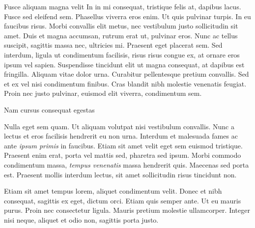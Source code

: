 \documentclass[final]{beamer}
\newlength{\colwidth}
\begin{document}
\begin{frame}[t]
\begin{columns}[t]
\begin{column}{\colwidth}
\begin{block}{Fusce aliquam magna velit}
    In in mi consequat, tristique felis at, dapibus lacus. Fusce sed eleifend
    sem. Phasellus viverra eros enim. Ut quis pulvinar turpis. In eu faucibus
    risus. Morbi convallis elit metus, nec vestibulum justo sollicitudin sit
    amet. Duis et magna accumsan, rutrum erat ut, pulvinar eros. Nunc ac tellus
    suscipit, sagittis massa nec, ultricies mi. Praesent eget placerat sem. Sed
    interdum, ligula ut condimentum facilisis, risus risus congue ex, at ornare
    eros ipsum vel sapien. Suspendisse tincidunt elit ut magna consequat, at
    dapibus est fringilla. Aliquam vitae dolor urna. Curabitur pellentesque
    pretium convallis. Sed et ex vel nisi condimentum finibus. Cras blandit
    nibh molestie venenatis feugiat. Proin nec justo pulvinar, euismod elit
    viverra, condimentum sem.

  \end{block}

  \begin{block}{Nam cursus consequat egestas}

    Nulla eget sem quam. Ut aliquam volutpat nisi vestibulum convallis. Nunc a
    lectus et eros facilisis hendrerit eu non urna. Interdum et malesuada fames
    ac ante \textit{ipsum primis} in faucibus. Etiam sit amet velit eget sem
    euismod tristique. Praesent enim erat, porta vel mattis sed, pharetra sed
    ipsum. Morbi commodo condimentum massa, \textit{tempus venenatis} massa
    hendrerit quis. Maecenas sed porta est. Praesent mollis interdum lectus,
    sit amet sollicitudin risus tincidunt non.

    Etiam sit amet tempus lorem, aliquet condimentum velit. Donec et nibh
    consequat, sagittis ex eget, dictum orci. Etiam quis semper ante. Ut eu
    mauris purus. Proin nec consectetur ligula. Mauris pretium molestie
    ullamcorper. Integer nisi neque, aliquet et odio non, sagittis porta justo.


\end{block}
\end{column}
\end{columns}
\end{frame}
\end{document}
